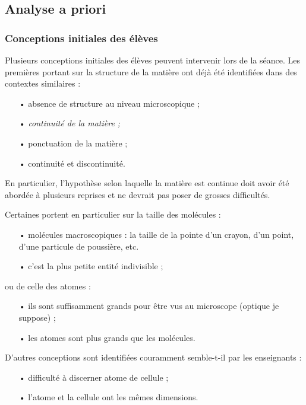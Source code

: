 \documentclass[12pt,a4paper]{article}
\begin{document}
\subsection{Analyse a priori}

\subsubsection{Conceptions initiales des élèves}

Plusieurs conceptions initiales des élèves peuvent intervenir lors de la séance.
Les premières portant sur la structure de la matière ont déjà été identifiées dans des contextes similaires \cite{Bain1985} :
\begin{itemize}
\item[•] absence de structure au niveau microscopique ;
\item[•] \emph{continuité de la matière ;}
\item[•] ponctuation de la matière ;
\item[•] continuité et discontinuité.
\end{itemize}
En particulier, l'hypothèse selon laquelle la matière est continue doit avoir été abordée à plusieurs reprises et ne devrait pas poser de grosses difficultés.

Certaines portent en particulier sur la taille des molécules \cite{Griffiths1992} :
\begin{itemize}
\item[•] molécules \og macroscopiques \fg{} : la taille de la pointe d'un crayon, d'un point, d'une particule de poussière, etc. 
\item[•] c'est la plus petite entité indivisible ;
\end{itemize}
ou de celle des atomes :
\begin{itemize}
\item[•] ils sont suffisamment grands pour être vus au microscope (optique je suppose) ;
\item[•] les atomes sont plus grands que les molécules.
\end{itemize}

D'autres conceptions sont identifiées couramment semble-t-il par les enseignants :
\begin{itemize}
\item[•] difficulté à discerner atome de cellule ;
\item[•] l'atome et la cellule ont les mêmes dimensions.
\end{itemize}
\end{document}

